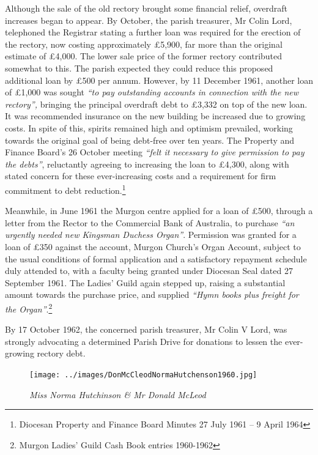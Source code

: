 Although the sale of the old rectory brought some financial relief, overdraft increases began to appear. By October, the parish treasurer, Mr Colin Lord, telephoned the Registrar stating a further loan was required for the erection of the rectory, now costing approximately \pounds5,900, far more than the original estimate of \pounds4,000. The lower sale price of the former rectory contributed somewhat to this. The parish expected they could reduce this proposed additional loan by \pounds500 per annum. However, by 11 December 1961, another loan of \pounds1,000 was sought \emph{``to pay outstanding accounts in connection with the new rectory'',} bringing the principal overdraft debt to \pounds3,332 on top of the new loan. It was recommended insurance on the new building be increased due to growing costs. In spite of this, spirits remained high and optimism prevailed, working towards the original goal of being debt-free over ten years. The Property and Finance Board's 26 October meeting \emph{``felt it necessary to give permission to pay the debts''}, reluctantly agreeing to increasing the loan to \pounds4,300, along with stated concern for these ever-increasing costs and a requirement for firm commitment to debt reduction.\footnote{Diocesan Property and Finance Board Minutes 27 July 1961 -- 9 April 1964}


Meanwhile, in June 1961 the Murgon centre applied for a loan of \pounds500, through a letter from the Rector to the Commercial Bank of Australia, to purchase \emph{``an urgently needed new Kingsman Duchess Organ''}. Permission was granted for a loan of \pounds350 against the account, Murgon Church's Organ Account, subject to the usual conditions of formal application and a satisfactory repayment schedule duly attended to, with a faculty being granted under Diocesan Seal dated 27 September 1961. The Ladies' Guild again stepped up, raising a substantial amount towards the purchase price, and supplied \emph{``Hymn books plus freight for the Organ''}.\footnote{Murgon Ladies' Guild Cash Book entries 1960-1962}


By 17 October 1962, the concerned parish treasurer, Mr Colin V Lord, was strongly advocating a determined Parish Drive for donations to lessen the ever-growing rectory debt.









\begin{figure}[!htb]
\begin{center}
\texttt{[image: ../images/DonMcCleodNormaHutchenson1960.jpg]}
\caption{\itshape Miss Norma Hutchinson \& Mr Donald McLeod}
\end{center}
\end{figure}




